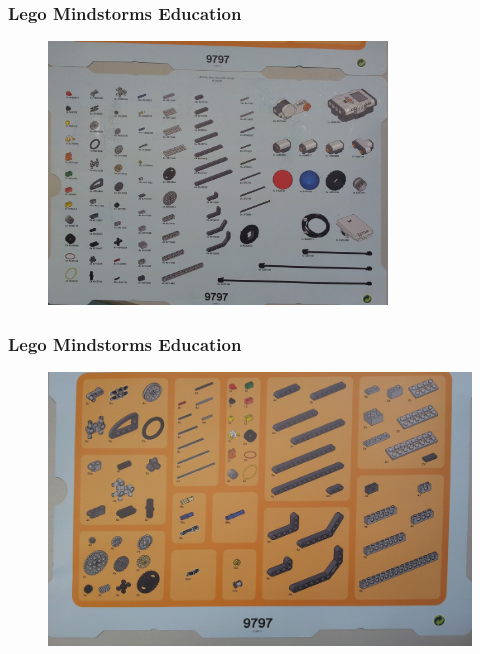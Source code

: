 \documentclass{beamer}
\begin{document}
\begin{frame}
\frametitle{Lego Mindstorms	Education}
\begin{figure}[htp]
\begin{center}
  \includegraphics[width=90mm]{imagens/pecas-000.jpg}
\end{center}
\end{figure}
\end{frame}

\begin{frame}
\frametitle{Lego Mindstorms	Education}
\begin{figure}[htp]
\begin{center}
  \includegraphics[width=\linewidth]{imagens/pecas-001.jpg}
\end{center}
\end{figure}
\end{frame}
\end{document}
